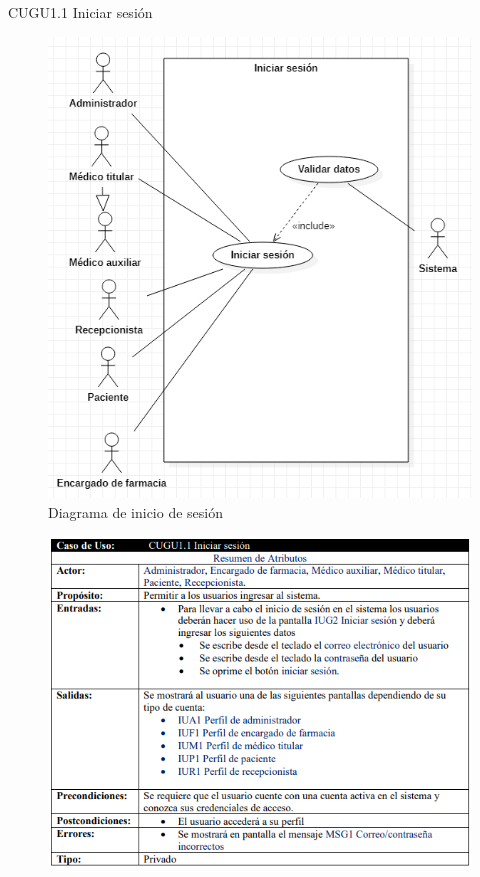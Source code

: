 \documentclass[12pt,letterpaper]{article}
\begin{document}
            \newpage
            CUGU1.1 Iniciar sesión 
            \begin{figure}[H]
                \centering
                \includegraphics [scale=0.3]{casosUso/iniciarSesion}
                \caption{Diagrama de inicio de sesión}
            \end{figure}
            \begin{figure}[H]
                \centering
                \includegraphics [scale=0.9]{specs/specIniciarSesion}
            \end{figure}
\end{document}
